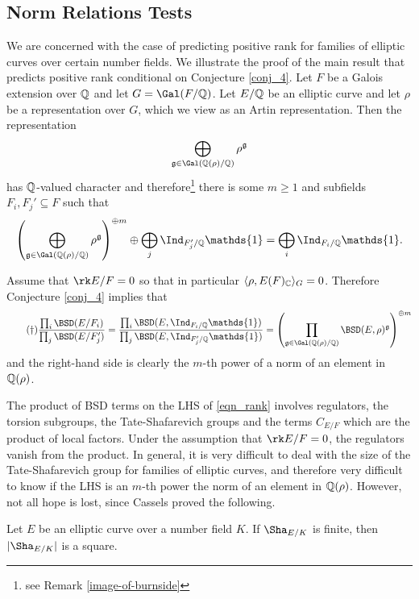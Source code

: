 \subsection{Norm Relations Tests}\label{sec-norm-rels-test}
We are concerned with the case of predicting positive rank for families of elliptic curves over certain number fields. We illustrate the proof of the main result that predicts positive rank conditional on Conjecture \ref{conj_4}. Let $F$ be a Galois extension over $\mathbb{Q}$ and let $G=\Gal(F/\QQ)$. Let $E/\mathbb{Q}$ be an elliptic curve and let $\rho$ be a representation over $G$, which we view as an Artin representation. Then the representation 
$$\bigoplus_{\mathfrak{g}\in\Gal(\QQ(\rho)/\QQ)}\rho^{\mathfrak{g}}$$
has $\mathbb{Q}$-valued character and therefore\footnote{see Remark \ref{image-of-burnside}} there is some $m\geq 1$ and subfields $F_i, F_j' \subseteq F$ such that 
$$\left(\bigoplus_{\mathfrak{g}\in\Gal(\QQ(\rho)/\QQ)}\rho^{\mathfrak{g}}\right)^{\oplus m}\oplus\bigoplus_j\Ind_{F'_j/\QQ}\mathds{1}=\bigoplus_i\Ind_{F_i/\QQ}\mathds{1}.$$

Assume that $\rk E/F=0$ so that in particular $\langle \rho, E(F)_{\mathbb{C}}\rangle_G=0$. Therefore Conjecture \ref{conj_4} implies that 
\begin{equation}\label{eqn_rank}\tag{\textdagger}
    \frac{\prod_i\BSD(E/F_i)}{\prod_j\BSD(E/F'_j)}=\frac{\prod_i\BSD(E,\Ind_{F_i/\QQ}\mathds{1})}{\prod_j\BSD(E, \Ind_{F'_j/\QQ}\mathds{1})}=\left(\prod_{\mathfrak{g}\in\Gal(\QQ(\rho)/\QQ)}\BSD(E,\rho)^{\mathfrak{g}}\right)^{\oplus m}
\end{equation}
and the right-hand side is clearly the $m$-th power of a norm of an element in $\mathbb{Q}(\rho)$. 

The product of BSD terms on the LHS of \eqref{eqn_rank} involves regulators, the torsion subgroups, the Tate-Shafarevich groups and the terms $C_{E/F}$ which are the product of local factors. Under the assumption that $\rk E/F=0$, the regulators vanish from the product. In general, it is very difficult to deal with the size of the Tate-Shafarevich group for families of elliptic curves, and therefore very difficult to know if the LHS is an $m$-th power the norm of an element in $\mathbb{Q}(\rho)$. However, not all hope is lost, since Cassels proved the following.

\begin{thm}
    Let $E$ be an elliptic curve over a number field $K$. If $\Sha_{E/K}$ is finite, then $|\Sha_{E/K}|$ is a square.
\end{thm}

